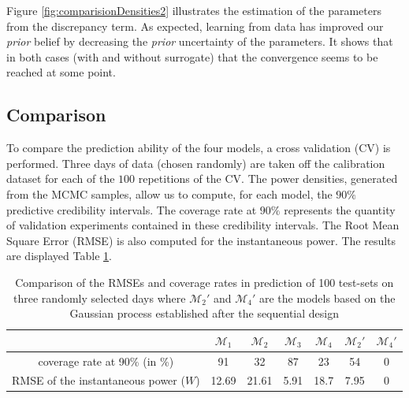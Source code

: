 \documentclass[soumission]{jsfds}
\begin{document}
Figure \ref{fig:comparisionDensities2} illustrates the estimation of the parameters from the discrepancy term.
As expected, learning from data has improved our \textit{prior} belief by decreasing the \textit{prior} uncertainty of the parameters. 
It shows that in both cases (with and without surrogate) that the convergence seems to be reached at some point. \newline

\subsection{Comparison}

To compare the prediction ability of the four models,
a cross validation (CV) is performed.
Three days of data (chosen randomly) are taken off the calibration dataset for each of the $100$ repetitions of the CV. 
The power densities, generated from the MCMC samples, allow us to compute, for each model, the $90\%$ predictive credibility intervals. 
The coverage rate at $90\%$ represents the quantity of validation experiments contained in these credibility intervals.
The Root Mean Square Error (RMSE) is also computed for the instantaneous power. The results are displayed Table 
\ref{tab:comparison}.\newline

\begin{table}[htbp!]
\centering
\caption{Comparison of the RMSEs and coverage rates in prediction of 100 test-sets on three randomly selected days where $\mathcal{M}_2'$ and $\mathcal{M}_4'$ are the models based on the Gaussian process established after the sequential design}
\label{tab:comparison}
\begin{tabular}{c|c|c|c|c|c|c}

& $\mathcal{M}_1$ & $\mathcal{M}_2$ & $\mathcal{M}_3$ & $\mathcal{M}_4$ & $\mathcal{M}_2'$&  $\mathcal{M}_4'$ \\
\hline
\hline
coverage rate at 90\% (in \%) & 91 & 32 & 87 & 23 & 54 & 0 \\
\hline
RMSE of the instantaneous power ($W$) & 12.69 & 21.61 & 5.91 & 18.7 & 7.95 & 0 \\
\end{tabular}
\end{table}
\end{document}
